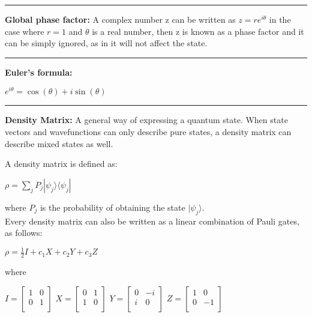 \documentclass{article}
\begin{document}
\hrule 
\vspace{5pt}

\newpage

\textbf{Global phase factor:}
A complex number z can be written as $z = re^{i\theta} $ in the case where $ r= 1$ and $\theta$ is a real number, then z is known as a phase factor and it can be simply ignored, as in it will not affect the state.

\vspace{5pt}
\hrule 
\vspace{5pt}

\textbf{Euler's formula:} 
\begin{center}
$ e^{i\theta} = \cos(\theta) + i\sin(\theta) $
\end{center}

\vspace{5pt}
\hrule 
\vspace{5pt}

\textbf{Density Matrix:} A general way of expressing a quantum state.
When state vectors and wavefunctions can only describe pure states, a density matrix can describe mixed states as well. 

A density matrix is defined as:

\begin{center}
$ \displaystyle \rho = \sum_{j} P_{j}  |{\psi}_{j} \rangle \langle{\psi}_{j} | $
\end{center}
where $P_{j}$ is the probability of obtaining the state $|\psi_{j} \rangle$. \\

Every density matrix can also be written as a linear combination of Pauli gates, as follows:

\begin{center}
$\rho = \frac{1}{2} I + c_{1} X + c_{2}Y + c_{3}Z$ \\ 
\end{center}

where
\begin{center}
$
  I =
  \left[ {\begin{array}{cc}
    1 & 0 \\
    0 & 1 \\
  \end{array} } \right] 
$
\quad
$
  X = \left[ {\begin{array}{cc}
    0 & 1 \\
    1 & 0 \\
  \end{array} } \right]
$
\quad
$
 Y = \left[ {\begin{array}{cc}
    0 & -i \\
    i & 0 \\
  \end{array} } \right]
$
\quad
$
  Z = \left[ {\begin{array}{cc}
    1 & 0 \\
    0 & -1 \\
  \end{array} } \right]
$

\end{center}
\end{document}
